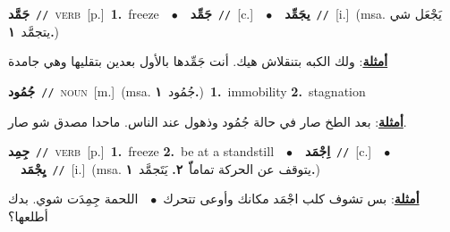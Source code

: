 \documentclass[10pt,a4paper,twoside]{article} %
\begin{document}
\begin{multicols}{2}
{\setlength\topsep{0pt}\textbf{\foreignlanguage{arabic}{جَمَّد}}\ {\color{gray}\texttt{//}\color{black}}\ \textsc{verb}\ [p.]\ \textbf{1.}~freeze\ \ $\bullet$\ \ \setlength\topsep{0pt}\textbf{\foreignlanguage{arabic}{جَمِّد}}\ {\color{gray}\texttt{//}\color{black}}\ [c.]\ \ $\bullet$\ \ \setlength\topsep{0pt}\textbf{\foreignlanguage{arabic}{يجَمِّد}}\ {\color{gray}\texttt{//}\color{black}}\ [i.]\ \color{gray}(msa. \foreignlanguage{arabic}{يَجْعَل شي يتجمَّد}~\foreignlanguage{arabic}{\textbf{١.}})\color{black}\  \begin{flushright}\color{gray}\foreignlanguage{arabic}{\textbf{\underline{\foreignlanguage{arabic}{أمثلة}}}: ولك الكبه بتنقلاش هيك. أنت جَمِّدها بالأول بعدين بتقليها وهي جامدة}\end{flushright}\color{black}} \vspace{2mm}

{\setlength\topsep{0pt}\textbf{\foreignlanguage{arabic}{جُمُود}}\ {\color{gray}\texttt{//}\color{black}}\ \textsc{noun}\ [m.]\ \color{gray}(msa. \foreignlanguage{arabic}{جُمُود}~\foreignlanguage{arabic}{\textbf{١.}})\color{black}\ \textbf{1.}~immobility  \textbf{2.}~stagnation\  \begin{flushright}\color{gray}\foreignlanguage{arabic}{\textbf{\underline{\foreignlanguage{arabic}{أمثلة}}}: بعد الطخ صار في حالة جُمُود وذهول عند الناس. ماحدا مصدق شو صار.}\end{flushright}\color{black}} \vspace{2mm}

{\setlength\topsep{0pt}\textbf{\foreignlanguage{arabic}{جِمِد}}\ {\color{gray}\texttt{//}\color{black}}\ \textsc{verb}\ [p.]\ \textbf{1.}~freeze  \textbf{2.}~be at a standstill\ \ $\bullet$\ \ \setlength\topsep{0pt}\textbf{\foreignlanguage{arabic}{اِجْمَد}}\ {\color{gray}\texttt{//}\color{black}}\ [c.]\ \ $\bullet$\ \ \setlength\topsep{0pt}\textbf{\foreignlanguage{arabic}{يِجْمَد}}\ {\color{gray}\texttt{//}\color{black}}\ [i.]\ \color{gray}(msa. \foreignlanguage{arabic}{يتوقف عن الحركة تماماّّ}~\foreignlanguage{arabic}{\textbf{٢.}}  \foreignlanguage{arabic}{يَتَجمَّد}~\foreignlanguage{arabic}{\textbf{١.}})\color{black}\  \begin{flushright}\color{gray}\foreignlanguage{arabic}{\textbf{\underline{\foreignlanguage{arabic}{أمثلة}}}: بس تشوف كلب اجْمَد مكانك وأوعى تتحرك\ $\bullet$\ \  اللحمة جِمِدَت شوي. بدك أطلعها؟}\end{flushright}\color{black}} \vspace{2mm}


\end{multicols}
\end{document}
